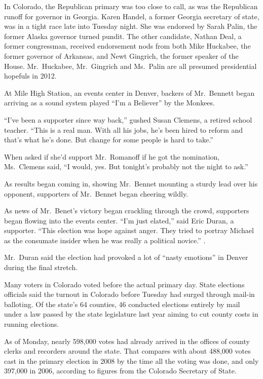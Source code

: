 ﻿\documentclass[12pt]{article}
\begin{document}
In Colorado, the Republican primary was too close to call, as was the Republican runoff for governor
in Georgia. Karen Handel, a former Georgia secretary of state, was in a tight race late into Tuesday
night. She was endorsed by Sarah Palin, the former Alaska governor turned pundit. The other
candidate, Nathan Deal, a former congressman, received endorsement nods from both Mike Huckabee, the
former governor of Arkansas, and Newt Gingrich, the former speaker of the House. Mr.~Huckabee,
Mr.~Gingrich and Ms.~Palin are all presumed presidential hopefuls in 2012.

At Mile High Station, an events center in Denver, backers of Mr.~Bennett began arriving as a sound
system played ``I'm a Believer'' by the Monkees.

``I've been a supporter since way back,'' gushed Susan Clemens, a retired school teacher. ``This is
a real man. With all his jobs, he's been hired to reform and that's what he's done. But change for
some people is hard to take.''

When asked if she'd support Mr.~Romanoff if he got the nomination, Ms.~Clemens said, ``I would, yes.
But tonight's probably not the night to ask.''

As results began coming in, showing Mr.~Bennet mounting a sturdy lead over his opponent, supporters
of Mr.~Bennet began cheering wildly.

As news of Mr.~Benet's victory began crackling through the crowd, supporters began flowing into the
events center. ``I'm just elated,'' said Eric Duran, a supporter. ``This election was hope against
anger. They tried to portray Michael as the consumate insider when he was really a political
novice.'' .

Mr.~Duran said the election had provoked a lot of ``nasty emotions'' in Denver during the final
stretch.

Many voters in Colorado voted before the actual primary day. State elections officials said the
turnout in Colorado before Tuesday had surged through mail-in balloting. Of the state's 64 counties,
46 conducted elections entirely by mail under a law passed by the state legislature last year aiming
to cut county costs in running elections.

As of Monday, nearly 598,000 votes had already arrived in the offices of county clerks and recorders
around the state. That compares with about 488,000 votes cast in the primary election in 2008 by the
time all the voting was done, and only 397,000 in 2006, according to figures from the Colorado
Secretary of State.
\end{document}
